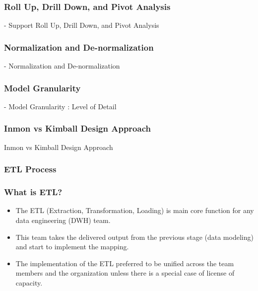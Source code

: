 
\begin{frame}
    \frametitle{Roll Up, Drill Down, and Pivot Analysis}

    - Support Roll Up, Drill Down, and Pivot Analysis\\

\end{frame}


\begin{frame}
    \frametitle{Normalization and De-normalization}

    - Normalization and De-normalization\\
\end{frame}


\begin{frame}
    \frametitle{Model Granularity}

    - Model Granularity : Level of Detail\\
\end{frame}



\begin{frame}
    \frametitle{Inmon vs Kimball Design Approach }

    Inmon vs Kimball Design Approach

\end{frame}

\subsubsection{ETL Process}

\begin{frame}
    \frametitle{What is ETL?}

    \begin{itemize}[<+->]
        \item The ETL (Extraction, Transformation, Loading) is main core function for any data engineering (DWH) team.
        \item This team takes the delivered output from the previous stage (data modeling) and start to implement the mapping.
        \item The implementation of the ETL preferred to be unified across the team members and the organization unless there is a special case of license of capacity.

    \end{itemize}


\end{frame}

